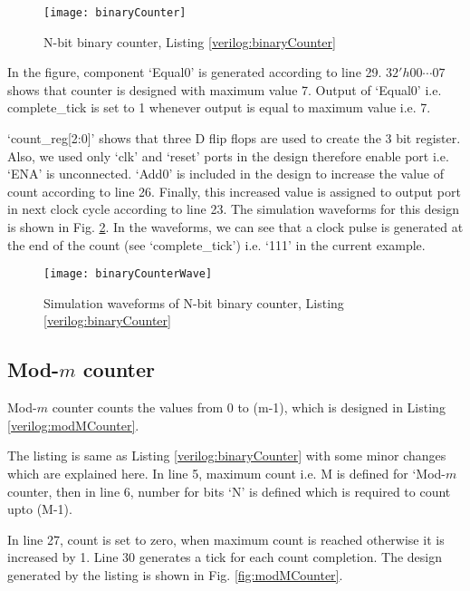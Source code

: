 

\begin{figure}[!h]
	\centering
	\texttt{[image: binaryCounter]}
	\caption{N-bit binary counter, Listing \ref{verilog:binaryCounter}}
	\label{fig:binaryCounter}
\end{figure}

\begin{explanation}
	In the figure, component `Equal0' is generated according to line 29. $32'h00 \cdots 07$ shows that counter is designed with maximum value 7. Output of `Equal0' i.e.  complete\_tick is set to 1 whenever output is equal to maximum value i.e. 7.
	
	`count\_reg[2:0]' shows that three D flip flops are used to create the 3 bit register. Also, we used only `clk' and `reset' ports in the design therefore enable port i.e. `ENA' is unconnected. `Add0' is included in the design to increase the value of count according to line 26. Finally, this increased value is assigned to output port in next clock cycle according to line 23. The simulation waveforms for this design is shown in Fig. \ref{fig:binaryCounterWave}. In the waveforms, we can see that a clock pulse is generated at the end of the count (see `complete\_tick') i.e. `111' in the current example. 
\end{explanation}

\begin{figure}[!h]
	\centering
	\texttt{[image: binaryCounterWave]}
	\caption{Simulation waveforms of N-bit binary counter, Listing \ref{verilog:binaryCounter}}
	\label{fig:binaryCounterWave}
\end{figure}

\subsection{Mod-$m$ counter}
Mod-$m$ counter counts the values from 0 to (m-1), which is designed in Listing \ref{verilog:modMCounter}. 

\begin{explanation}
	The listing is same as Listing \ref{verilog:binaryCounter} with some minor changes which are explained here. In line 5, maximum count i.e. M is defined for `Mod-$m$ counter, then in line 6, number for bits `N' is defined which is required to count upto (M-1).
	
	In line 27, count is set to zero, when maximum count is reached otherwise it is increased by 1. Line 30 generates a tick for each count completion. The design generated by the listing is shown in Fig. \ref{fig:modMCounter}.
\end{explanation}



